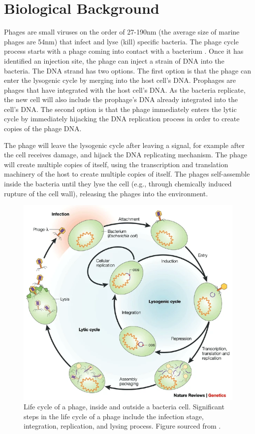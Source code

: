 \section{Biological Background}
Phages are small viruses on the order of 27-190nm (the average size of marine phages are 54nm) that infect and lyse (kill) specific bacteria.
The phage cycle process starts with a phage coming into contact with a bacterium .
Once it has identified an injection site, the phage can inject a strain of DNA into the bacteria.
The DNA strand has two options. 
The first option is that the phage can enter the lysogenic cycle by merging into the host cell's DNA. 
Prophages are phages that have integrated with the host cell's DNA. 
As the bacteria replicate, the new cell will also include the prophage's DNA already integrated into the cell's DNA. 
The second option is that the phage immediately enters the lytic cycle by immediately hijacking the DNA replication process in order to create copies of the phage DNA. 

The phage will leave the lysogenic cycle after leaving a signal, for example after the cell receives damage, and hijack the DNA replicating mechanism. 
The phage will create multiple copies of itself, using the transcription and translation machinery of the host to create multiple copies of itself.
The phages self-assemble inside the bacteria until they lyse the cell (e.g., through chemically induced rupture of the cell wall), releasing the phages into the environment. 

\begin{figure}
    \centering
    \includegraphics[width=0.5\linewidth]{Figures/phage_life_cycle.png}
    \caption{Life cycle of a phage, inside and outside a bacteria cell. Significant steps in the life cycle of a phage include the infection stage, integration, replication, and lysing process. Figure sourced from \citet{campbellFutureBacteriophageBiology2003}. }
    \label{fig:phage_life_cycle}
\end{figure}

